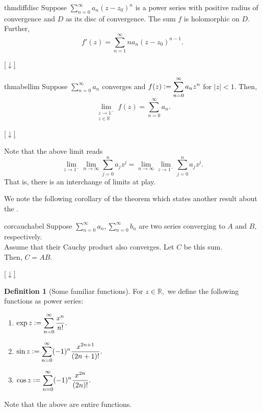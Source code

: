 \documentclass[12pt,oneside]{book}
\theoremstyle{definition}
\numberwithin{thm}{chapter}
\newtheorem{defn}[thm]{Definition}
\newcommand{\downsym}{[$\downarrow$]}
\begin{document}
\begin{restatable}{thm}{diffdisc}
\label{thm:diffdisc}
	Suppose $\displaystyle\sum_{n=0}^{\infty}a_n(z - z_0)^n$ is a power series with positive radius of convergence and $D$ as its disc of convergence. The sum $f$ is holomorphic on $D.$\\
	Further,
	\begin{equation*} 
		f'(z) = \displaystyle\sum_{n=1}^{\infty}na_n(z - z_0)^{n-1}.
	\end{equation*}
\end{restatable}
\begin{flushright}\hyperref[thm:diffdisc2]{\downsym}\end{flushright}

\begin{restatable}{thm}{abellim}
\label{thm:abellim}
	Suppose $\displaystyle\sum_{n=0}^{\infty}a_n$ converges and $f(z) \vcentcolon= \displaystyle\sum_{n=0}^{\infty}a_nz^n$ for $|z| < 1.$ Then,
	\begin{equation*} 
		\lim_{\substack{z \to 1^-\\z\in\mathbb{R}}}f(z) = \sum_{n=0}^{\infty}a_n.
	\end{equation*}
\end{restatable}
\begin{flushright}\hyperref[thm:abellim2]{\downsym}\end{flushright}
Note that the above limit reads
\begin{equation*} 
	\lim_{z\to 1^-}\lim_{n\to \infty}\sum_{j=0}^{n}a_jz^j = \lim_{n\to \infty}\lim_{z\to 1^-}\sum_{j=0}^{n}a_jz^j.
\end{equation*}
That is, there is an interchange of limits at play.

We note the following corollary of the theorem which states another result about the .
\begin{restatable}[]{cor}{cauchabel}
\label{cor:cauchabel}
	Suppose $\displaystyle\sum_{n=0}^{\infty}a_n, \displaystyle\sum_{n=0}^{\infty}b_n$ are two series converging to $A$ and $B,$ respectively.\\
	Assume that their Cauchy product also converges. Let $C$ be this sum.\\
	Then, $C = AB.$
\end{restatable}
\begin{flushright}\hyperref[cor:cauchabel2]{\downsym}\end{flushright}

\begin{defn}[Some familiar functions]
	For $z \in \mathbb{R},$ we define the following functions as power series:
	\begin{enumerate}
		\item $\exp z \vcentcolon= \displaystyle\sum_{n=0}^{\infty}\dfrac{x^n}{n!}.$
		\item $\sin z \vcentcolon= \displaystyle\sum_{n=0}^{\infty}(-1)^n\dfrac{x^{2n+1}}{(2n+1)!}.$
		\item $\cos z \vcentcolon= \displaystyle\sum_{n=0}^{\infty}(-1)^n\dfrac{x^{2n}}{(2n)!}.$
	\end{enumerate}
\end{defn}
Note that the above are entire functions.
\end{document}
